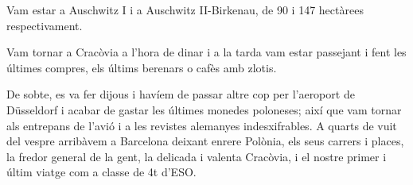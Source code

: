 \begin{news}
Vam estar a Auschwitz I i a Auschwitz II-Birkenau, de 90 i 147 hectàrees respectivament. 

Vam tornar a Cracòvia a l’hora de dinar i a la tarda vam estar passejant i fent les últimes compres, els últims berenars o cafès amb zlotis. 

De sobte, es va fer dijous i havíem de passar altre cop per l’aeroport de Düsseldorf i acabar de gastar les últimes monedes poloneses; així que vam tornar als entrepans de l’avió i a les revistes alemanyes indesxifrables. A quarts de vuit del vespre arribàvem a Barcelona deixant enrere Polònia, els seus carrers i places, la fredor general de la gent, la delicada i valenta Cracòvia, i el nostre primer i últim viatge com a classe de 4t d’ESO. 



\end{news}

